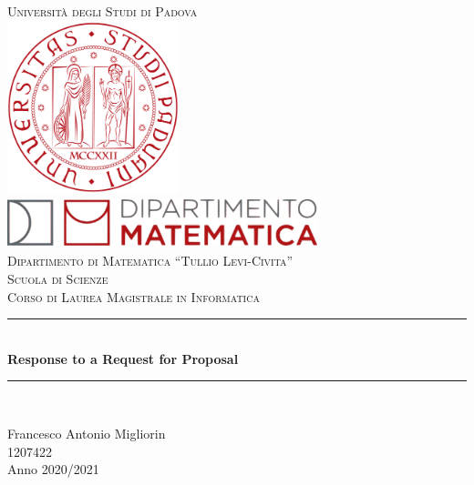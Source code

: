 \documentclass[12pt, a4paper, titlepage]{article}
\begin{document}
\newcommand{\HRule}{\rule{\linewidth}{0.5mm}}

\begin{center}

	\textsc{\LARGE Università degli Studi di Padova}\\[1cm]

	\includegraphics[height=5cm]{img/UniPd.png}\\[1cm]

	\includegraphics[height=1.5cm, width = 9cm]{img/MathDip.png}\\
	\textsc{Dipartimento di Matematica ``Tullio Levi-Civita''}\\[1.2cm]
	\textsc{\Large Scuola di Scienze}\\[0.5cm]

	\textsc{\large Corso di Laurea Magistrale in Informatica}\\[0.5cm]

	\vspace{2.5cm}


	\HRule \\[0.4cm]
	{ \huge \bfseries Response to a Request for Proposal }\\[0.4cm]
	\HRule \\[1.5cm]


	\vspace{2.5cm}


	{\large
		Francesco Antonio Migliorin \\
		1207422 \\
		Anno 2020/2021}\\[2cm]


	\vfill
\end{center}



\setcounter{tocdepth}{2}
\tableofcontents
\newpage
\listoffigures
\newpage
\listoftables
\setcounter{table}{0}
\pagestyle{fancy}
\fancyhf{}
\cfoot{\thepage}








\glsaddall
\clearpage
{}
\printglossary[type=\acronymtype]
\newpage
\printglossary[type=main]
\newpage


\end{document}
